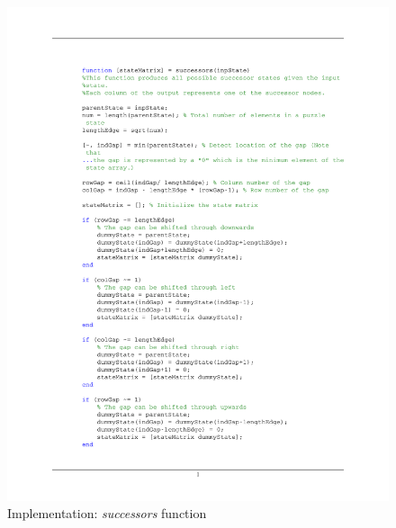 \documentclass[12pt]{article}
\begin{document}
\begin{figure}[htb]
	\centering
	\includegraphics[width=1\columnwidth]{images/Code_successors.pdf}
	\caption{Implementation: \textit{successors} function}
	\label{}
\end{figure}
\end{document}
